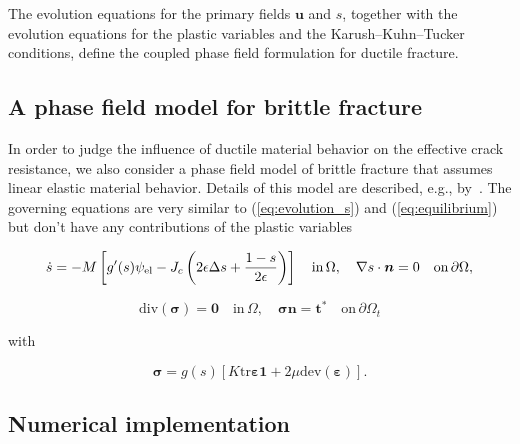 \documentclass[pdflatex,sn-mathphys-num]{sn-jnl}%
\theoremstyle{thmstyleone}%
\theoremstyle{thmstyletwo}%
\theoremstyle{thmstylethree}%
\begin{document}
The evolution equations for the primary fields $\boldsymbol{u}$ and $s$, together with the evolution equations for the plastic variables and the Karush--Kuhn--Tucker conditions, define the coupled phase field formulation for ductile fracture.


\subsection{A phase field model for brittle fracture}
\label{sec:phasefield_elastic}

In order to judge the influence of ductile material behavior on the effective crack resistance, 
we also consider a phase field model of brittle fracture that assumes linear elastic material behavior. 
Details of this model are described, e.g., by~\cite{kuhn_continuum_2010}. The governing equations 
are very similar to (\ref{eq:evolution_s}) and (\ref{eq:equilibrium}) but don't have
any contributions of the plastic variables  

\begin{equation}
    \dot{s} = -M \left[g'(s)\psi_{\rm{el}}  - J_c\left(2\epsilon\Delta{s} + \dfrac{1-s}{2\epsilon}\right)\right] \quad \text{in} \, \Omega, \quad \nabla{s}\cdot{\boldsymbol{n}} = 0\quad\text{on}\,\partial\Omega,
    \label{eq:evolution_s_elastic}
\end{equation}

\begin{equation}
    \text{div}(\boldsymbol{\sigma}) = \boldsymbol{0} \quad \text{in} \, \Omega, \quad{\boldsymbol{\sigma} \boldsymbol{n} =\boldsymbol{t}^*} \quad\text{on}\,\partial\Omega_t
    \label{eq:equilibrium_elastic}
\end{equation}

with 

\begin{equation}
    \boldsymbol{\sigma} = g(s)\left[K \text{tr}\boldsymbol{\varepsilon}\boldsymbol{1} + 2\mu\text{dev}(\boldsymbol{\varepsilon})\right].
\end{equation}



\subsection{Numerical implementation}
\label{sec:numerical_implementation}
\end{document}
